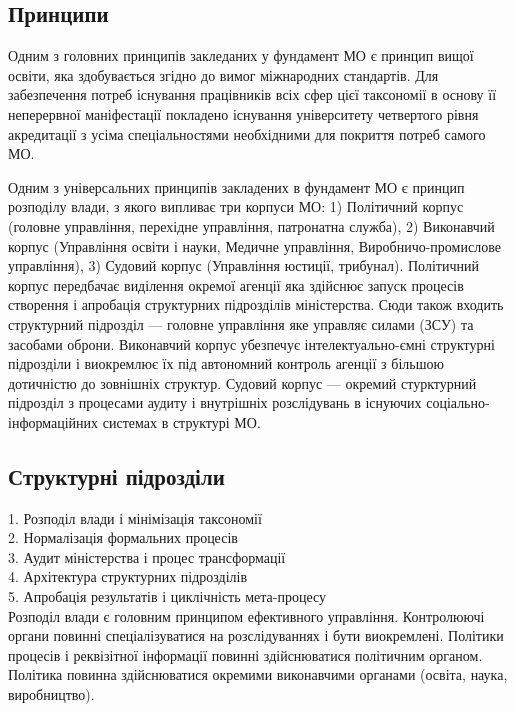 \subsection{Принципи}

Одним з головних принципів закледаних у фундамент МО є принцип вищої освіти, яка здобувається згідно до вимог міжнародних стандартів. Для забезпечення потреб існування працівників всіх сфер цієї таксономії в основу її неперервної маніфестації покладено існування університету четвертого рівня акредитації з усіма спеціальностями необхідними для покриття потреб самого МО.

Одним з універсальних принципів закладених в фундамент МО є принцип розподілу влади, з якого випливає три корпуси МО: 1) Політичний корпус (головне управління, перехідне управління, патронатна служба), 2) Виконавчий корпус (Управління освіти і науки, Медичне управління, Виробничо-промислове управління), 3) Судовий корпус (Управління юстиції, трибунал). Політичний корпус передбачає виділення окремої агенції яка здійснює запуск процесів створення і апробація структурних підрозділів міністерства. Сюди також входить структурний підрозділ — головне управління яке управляє силами (ЗСУ) та засобами оброни. Виконавчий корпус убезпечує інтелектуально-ємні структурні підрозділи і виокремлює їх під автономний контроль агенції з більшою дотичністю до зовнішніх структур. Судовий корпус — окремий стурктурний підрозділ з процесами аудиту і внутрішніх розслідувань в існуючих соціально-інформаційних системах в структурі МО.

\subsection{Структурні підрозділи}

1. Розподіл влади і мінімізація таксономії \\
2. Нормалізація формальних процесів \\
3. Аудит міністерства і процес трансформації \\
4. Архітектура структурних підрозділів \\
5. Апробація результатів і циклічність мета-процесу \\

Розподіл влади є головним принципом ефективного управління. Контролюючі
органи повинні спеціалізуватися на розслідуваннях і бути виокремлені.
Політики процесів і реквізітної інформації повинні здійснюватися політичним
органом. Політика повинна здійснюватися окремими виконавчими
органами (освіта, наука, виробництво).

